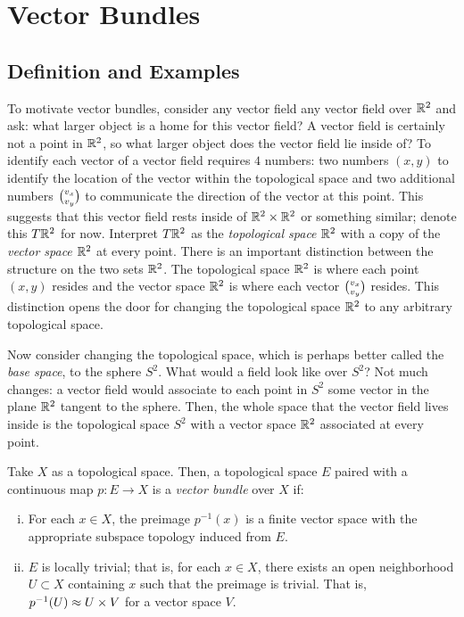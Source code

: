 \documentclass[../sean_thesis.tex]{subfiles}
\begin{document}
\chapter{Vector Bundles}


\section{Definition and Examples}

To motivate vector bundles, consider any vector field any vector field over $\mathbb{R}^2$ and ask: what larger object is a home for this vector field? A vector field is certainly not a point in $\mathbb{R}^2$, so what larger object does the vector field lie inside of? To identify each vector of a vector field requires $4$ numbers: two numbers $(x,y)$ to identify the location of the vector within the topological space and two additional numbers $v_x \choose v_y$ to communicate the direction of the vector at this point. This suggests that this vector field rests inside of $\mathbb{R}^2 \times \mathbb{R}^2$ or something similar; denote this $T\mathbb{R}^2$ for now. Interpret $T\mathbb{R}^2$ as the \emph{topological space} $\mathbb{R}^2$ with a copy of the \emph{vector space} $\mathbb{R}^2$ at every point. There is an important distinction between the structure on the two sets $\mathbb{R}^2$. The topological space $\mathbb{R}^2$ is where each point $(x,y) $ resides and the vector space $\mathbb{R}^2$ is where each vector $v_x \choose v_y$ resides. This distinction opens the door for changing the topological space $\mathbb{R}^2$ to any arbitrary topological space.

Now consider changing the topological space, which is perhaps better called the \emph{base space}, to the sphere $S^2$. What would a field look like over $S^2$? Not much changes: a vector field would associate to each point in $S^2$ some vector in the plane $\mathbb{R}^2$ tangent to the sphere. Then, the whole space that the vector field lives inside is the topological space $S^2$ with a vector space $\mathbb{R}^2$ associated at every point.


\begin{definition}
\label{def:vector_bundle}
	Take $X$ as a topological space. Then, a topological space $E$ paired with a continuous map $p: E \to X$ is a \emph{vector bundle} over $X$ if:
\vspace{-\varparskip}
	\begin{enumerate}[(i)]
		\item For each $x \in X$, the preimage $p^{-1}(x)$ is a finite vector space with the appropriate subspace topology induced from $E$.
		\item $E$ is locally trivial; that is, for each $x \in X$, there exists an open neighborhood $U \subset X$ containing $x$ such that the preimage is trivial. That is, $p^{-1}(U) \approx U \times V$ for a vector space $V$.
	\end{enumerate}
\end{definition}
\end{document}
